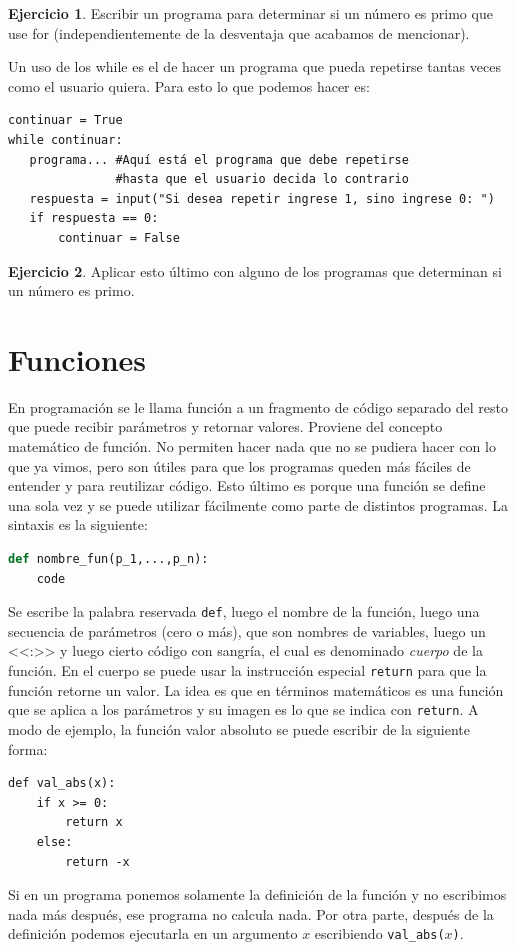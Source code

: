 \documentclass[a4paper, 12pt]{report}
\theoremstyle{definition}
\newtheorem{ejercicio}{Ejercicio}[section]
\begin{document}
\begin{ejercicio}
	Escribir un programa para determinar si un número es primo que use for (independientemente de la desventaja que acabamos de mencionar).
\end{ejercicio}

Un uso de los while es el de hacer un programa que pueda repetirse tantas veces como el usuario quiera. Para esto lo que podemos hacer es:
\begin{verbatim}
continuar = True
while continuar:
   programa... #Aquí está el programa que debe repetirse
               #hasta que el usuario decida lo contrario
   respuesta = input("Si desea repetir ingrese 1, sino ingrese 0: ")
   if respuesta == 0:
       continuar = False
\end{verbatim}
\begin{ejercicio}
	Aplicar esto último con alguno de los programas que determinan si un número es primo.
\end{ejercicio}
\section{Funciones}

En programación se le llama función a un fragmento de código separado del resto que puede recibir parámetros y retornar valores. Proviene del concepto matemático de función. No permiten hacer nada que no se pudiera hacer con lo que ya vimos, pero son útiles para que los programas queden más fáciles de entender y para reutilizar código. Esto último es porque una función se define una sola vez y se puede utilizar fácilmente como parte de distintos programas. La sintaxis es la siguiente:
\begin{lstlisting}[language=python]
def nombre_fun(p_1,...,p_n):
    code	
\end{lstlisting}
Se escribe la palabra reservada {\tt def}, luego el nombre de la función, luego una secuencia de parámetros (cero o más), que son nombres de variables, luego un <<:>> y luego cierto código con sangría, el cual es denominado {\sl cuerpo} de la función. En el cuerpo se puede usar la instrucción especial {\tt return} para que la función retorne un valor. La idea es que en términos matemáticos es una función que se aplica a los parámetros y su imagen es lo que se indica con {\tt return}. A modo de ejemplo, la función valor absoluto se puede escribir de la siguiente forma:
\begin{verbatim}
def val_abs(x):
    if x >= 0:
        return x
    else:
        return -x
\end{verbatim}
Si en un programa ponemos solamente la definición de la función y no escribimos nada más después, ese programa no calcula nada. Por otra parte, después de la definición podemos ejecutarla en un argumento $x$ escribiendo {\tt val\_abs($x$)}. 
\end{document}
